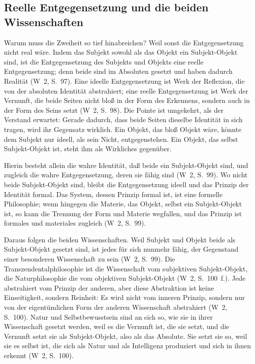 \documentclass[11pt,a4paper]{article}
\newcommand{\SO}{Subjekt-Objekt}
\newcommand{\Werke}[1]{(W~2, S.~#1)}
\begin{document}
\subsection{Reelle Entgegensetzung und die beiden Wissenschaften}

Warum muss die Zweiheit so tief hinabreichen? Weil sonst die Entgegensetzung nicht real wäre. \glqq Indem das Subjekt sowohl als das Objekt ein \SO{} sind, ist die Entgegensetzung des Subjekts und Objekts eine reelle Entgegensetzung; denn beide sind im Absoluten gesetzt und haben dadurch Realität\grqq{} \Werke{97}. Eine ideelle Entgegensetzung ist Werk der Reflexion, die von der absoluten Identität abstrahiert; eine reelle Entgegensetzung ist Werk der Vernunft, die beide Seiten \glqq nicht bloß in der Form des Erkennens, sondern auch in der Form des Seins\grqq{} setzt \Werke{98}. Die Pointe ist umgekehrt, als der Verstand erwartet: Gerade dadurch, dass beide Seiten dieselbe Identität in sich tragen, wird ihr Gegensatz wirklich. Ein Objekt, das bloß Objekt wäre, könnte dem Subjekt nur ideell, als sein Nicht, entgegenstehen. Ein Objekt, das selbst \SO{} ist, steht ihm als Wirkliches gegenüber.

\glqq Hierin besteht allein die wahre Identität, daß beide ein \SO{} sind, und zugleich die wahre Entgegensetzung, deren sie fähig sind\grqq{} \Werke{99}. Wo nicht beide \SO{} sind, bleibt die Entgegensetzung ideell und das Prinzip der Identität formal. Das System, dessen Prinzip formal ist, ist eine formelle Philosophie; wenn hingegen \glqq die Materie, das Objekt, selbst ein \SO{} ist, so kann die Trennung der Form und Materie wegfallen\grqq{}, und das Prinzip ist \glqq formales und materiales zugleich\grqq{} \Werke{99}.

Daraus folgen die beiden Wissenschaften. Weil Subjekt und Objekt beide als \SO{} gesetzt sind, ist \glqq jedes für sich nunmehr fähig, der Gegenstand einer besonderen Wissenschaft zu sein\grqq{} \Werke{99}. Die Transzendentalphilosophie ist die Wissenschaft vom subjektiven \SO{}, die Naturphilosophie die vom objektiven \SO{} \Werke{100~f.}. Jede abstrahiert vom Prinzip der anderen, aber diese Abstraktion ist keine Einseitigkeit, sondern Reinheit: Es wird nicht vom inneren Prinzip, sondern nur von der eigentümlichen Form der anderen Wissenschaft abstrahiert \Werke{100}. Natur und Selbstbewusstsein sind an sich so, wie sie in ihrer Wissenschaft gesetzt werden, \glqq weil es die Vernunft ist, die sie setzt, und die Vernunft setzt sie als \SO{}, also als das Absolute\grqq{}. Sie setzt sie so, \glqq weil sie es selbst ist, die sich als Natur und als Intelligenz produziert und sich in ihnen erkennt\grqq{} \Werke{100}.
\end{document}

